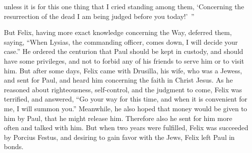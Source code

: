 {unless it is for this one thing that I cried standing among them, ‘Concerning the resurrection of the dead I am being judged before you today!’ ”
\par }{\PP {}But Felix, having more exact knowledge concerning the Way, deferred them, saying, “When Lysias, the commanding officer, comes down, I will decide your case.”
He ordered the centurion that Paul should be kept in custody, and should have some privileges, and not to forbid any of his friends to serve him or to visit him.
But after some days, Felix came with Drusilla, his wife, who was a Jewess, and sent for Paul, and heard him concerning the faith in Christ Jesus.
As he reasoned about righteousness, self-control, and the judgment to come, Felix was terrified, and answered, “Go your way for this time, and when it is convenient for me, I will summon you.”
Meanwhile, he also hoped that money would be given to him by Paul, that he might release him. Therefore also he sent for him more often and talked with him.
But when two years were fulfilled, Felix was succeeded by Porcius Festus, and desiring to gain favor with the Jews, Felix left Paul in bonds.

}
